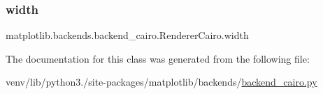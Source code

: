 \subsubsection{\texorpdfstring{width}{width}}
{\footnotesize\ttfamily matplotlib.\+backends.\+backend\+\_\+cairo.\+Renderer\+Cairo.\+width}



The documentation for this class was generated from the following file\+:\begin{DoxyCompactItemize}
\item 
venv/lib/python3./site-\/packages/matplotlib/backends/\hyperlink{backend__cairo_8py}{backend\+\_\+cairo.\+py}\end{DoxyCompactItemize}
